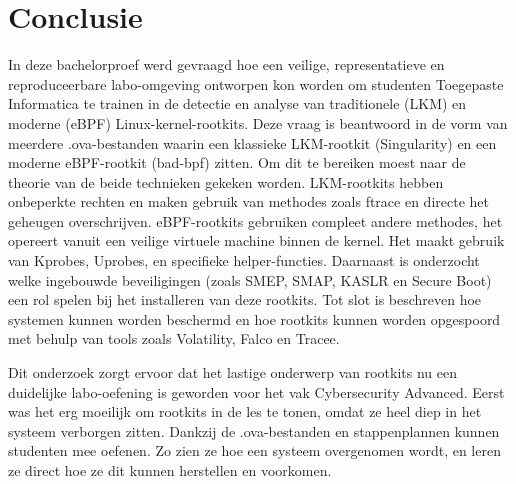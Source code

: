 
\chapter{Conclusie}%
\label{ch:conclusie}


In deze bachelorproef werd gevraagd hoe een veilige, representatieve en reproduceerbare labo-omgeving ontworpen kon worden om studenten Toegepaste Informatica te trainen in de detectie en analyse van traditionele (LKM) en moderne (eBPF) Linux-kernel-rootkits. Deze vraag is beantwoord in de vorm van meerdere .ova-bestanden waarin een klassieke LKM-rootkit (Singularity) en een moderne eBPF-rootkit (bad-bpf) zitten. Om dit te bereiken moest naar de theorie van de beide technieken gekeken worden. LKM-rootkits hebben onbeperkte rechten en maken gebruik van methodes zoals ftrace en directe het geheugen overschrijven. eBPF-rootkits gebruiken compleet andere methodes, het opereert vanuit een veilige virtuele machine binnen de kernel. Het maakt gebruik van Kprobes, Uprobes, en specifieke helper-functies. Daarnaast is onderzocht welke ingebouwde beveiligingen (zoals SMEP, SMAP, KASLR en Secure Boot) een rol spelen bij het installeren van deze rootkits. Tot slot is beschreven hoe systemen kunnen worden beschermd en hoe rootkits kunnen worden opgespoord met behulp van tools zoals Volatility, Falco en Tracee.

Dit onderzoek zorgt ervoor dat het lastige onderwerp van rootkits nu een duidelijke labo-oefening is geworden voor het vak Cybersecurity Advanced. Eerst was het erg moeilijk om rootkits in de les te tonen, omdat ze heel diep in het systeem verborgen zitten. Dankzij de .ova-bestanden en stappenplannen kunnen studenten mee oefenen. Zo zien ze hoe een systeem overgenomen wordt, en leren ze direct hoe ze dit kunnen herstellen en voorkomen.


